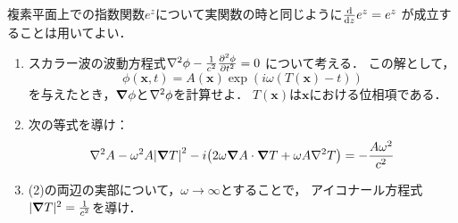 \documentclass[dvipdfmx,a4j,11pt]{jsarticle}
\begin{document}
\begin{enumerate}[1.]
         複素平面上での指数関数$e^z$について実関数の時と同じように$\dv{z} e^z=e^z$
         が成立することは用いてよい．
         \begin{enumerate}[(1)]
            \item スカラー波の波動方程式$\laplacian \phi -\frac{1}{c^2}\pdv[2]{\phi}{t}=0 $
                  について考える．
                  この解として，
                  \[ \phi(\bm{x},t) =A(\bm{x})\exp(i\omega (T(\bm{x})-t))\]
                  を与えたとき，$\grad \phi$と$\laplacian \phi$を計算せよ．
                  $T(\bm{x})$は$\bm{x}$における位相項である．
            \item 次の等式を導け：
                  \[\laplacian A- \omega^2 A\qty|\grad T|^2
                  -i\qty(2\omega \grad A \cdot \grad T+\omega A \laplacian T)=
                  -\frac{A\omega^2}{c^2} \]
            \item (2)の両辺の実部について，$\omega\to \infty$とすることで，
                  アイコナール方程式$|\grad T|^2=\frac{1}{c^2}$を導け．
         \end{enumerate}

\end{enumerate}
\end{document}

